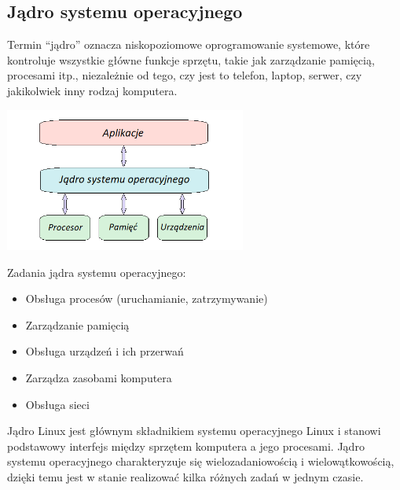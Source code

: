 \documentclass[10pt,a4paper]{report}
\begin{document}
\begin{adjustwidth}{2cm}{2cm}
\section{Jądro systemu operacyjnego}
\begin{minipage}{1\linewidth}
Termin “jądro” oznacza niskopoziomowe oprogramowanie systemowe, które kontroluje wszystkie główne funkcje sprzętu, takie jak zarządzanie pamięcią, procesami itp., niezależnie od tego, czy jest to telefon, laptop, serwer, czy jakikolwiek inny rodzaj komputera.  
\end{minipage}
 \begin{minipage}{\linewidth}
\begin{center}
  \includegraphics[width=300px]{img/jadro}
\end{center}
\end{minipage}
\begin{minipage}{1\linewidth}
Zadania jądra systemu operacyjnego: \\
\begin{adjustwidth}{0.5cm}{0cm}
\begin{itemize}
\setlength\itemsep{0.3cm}
    \item[\ding{118}] Obsługa procesów (uruchamianie, zatrzymywanie)
    \item[\ding{118}] Zarządzanie pamięcią
    \item[\ding{118}] Obsługa urządzeń i ich przerwań
    \item[\ding{118}] Zarządza zasobami komputera 
    \item[\ding{118}] Obsługa sieci 
\end{itemize}
\end{adjustwidth}
\vspace{0.3cm}
Jądro Linux jest głównym składnikiem systemu operacyjnego Linux i stanowi podstawowy interfejs między sprzętem komputera a jego procesami. Jądro systemu operacyjnego charakteryzuje się wielozadaniowością i wielowątkowością, dzięki temu jest w stanie realizować kilka różnych zadań w jednym czasie. 
\end{minipage}

\end{adjustwidth}
\end{document}
